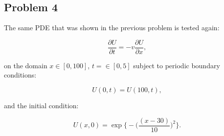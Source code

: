 \clearpage

\subsection{Problem 4}

The same PDE that was shown in the previous problem is tested again:

\begin{equation}
    \frac{\partial U}{\partial t} = -v\frac{\partial U}{\partial x},
    \label{eq:convection_PDE}
\end{equation}

\noindent on the domain $x \in [0, 100]$, $t =\in [0, 5]$ subject to periodic boundary conditions:

\begin{equation}
    U(0,t) = U(100, t),
\end{equation}

\noindent and the initial condition:

\begin{equation}
    U(x,0) = \exp\bigg\{-\bigg(\frac{(x-30)}{10}\bigg)^{2}\bigg\}.
\end{equation}

